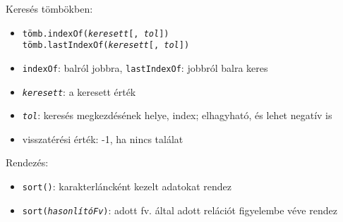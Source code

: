 \begin{frame}
  \footnotesize
  Keresés tömbökben: 
  \begin{itemize}
    \item \texttt{tömb.indexOf(\emph{keresett}[, \emph{tol}])} \\
          \texttt{tömb.lastIndexOf(\emph{keresett}[, \emph{tol}])}
    \item \texttt{indexOf}: balról jobbra, \texttt{lastIndexOf}: jobbról balra keres
    \item \texttt{\emph{keresett}}: a keresett érték
    \item \texttt{\emph{tol}}: keresés megkezdésének helye, index; elhagyható, és lehet negatív is
    \item visszatérési érték: -1, ha nincs találat
  \end{itemize}
  \scriptsize
  \begin{exampleblock}{}
    \vspace{-0.3cm}
    
    \vspace{-0.3cm}
  \end{exampleblock}
\end{frame}

\begin{frame}
  \small
  Rendezés:
  \begin{itemize}
    \item \texttt{sort()}: karakterláncként kezelt adatokat rendez
    \item \texttt{sort(\emph{hasonlítóFv})}: adott fv. által adott relációt figyelembe véve rendez
  \end{itemize}
  \footnotesize
  \begin{exampleblock}{}
    \vspace{-0.3cm}
    
    \vspace{-0.3cm}
  \end{exampleblock}
\end{frame}

